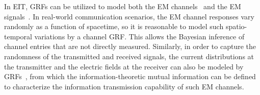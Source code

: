 \documentclass[journal,twocolumn]{IEEEtran}
\begin{document}
In EIT, GRFs can be utilized to model both the EM channels~\cite{marzetta2022fourier} and the EM signals~\cite{wan2022mutual}. 
In real-world communication scenarios, the EM channel responses vary randomly as a function of spacetime, so it is reasonable to model such spatio-temporal variations by a channel GRF. 
This allows the Bayesian inference of channel entries that are not directly measured. 
Similarly, in order to capture the randomness of the transmitted and received signals, the current distributions at the transmitter and the electric fields at the receiver can also be modeled by GRFs~\cite{wan2022mutual}, from which the information-theoretic mutual information can be defined to characterize the information transmission capability of such EM channels. 



\end{document}

